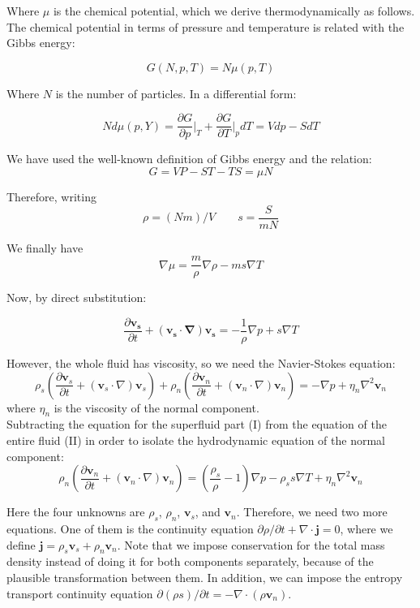 \documentclass{article}
\begin{document}
Where $\mu$ is the chemical potential, which we derive thermodynamically as follows. The chemical potential in terms of pressure and temperature is related with the Gibbs energy:

\[G(N, p, T)= N \mu(p, T)\]

Where $N$ is the number of particles. In a differential form:

\[N d\mu(p, Y) = \frac{\partial G}{\partial p} \bigg|_T + \frac{\partial G}{\partial T}\bigg|_p dT = Vdp - S dT\]

We have used the well-known definition of Gibbs energy and the relation:
\[G = VP - ST - TS = \mu N\]

Therefore, writing 
\[\rho = (Nm)/V \qquad s = \frac{S}{mN}\]

We finally have
\[\nabla \mu = \frac{m}{\rho} \nabla \rho - m s \nabla T\]

Now, by direct substitution:

\[\frac{\partial \mathbf{v_s}}{\partial t} + (\mathbf{v_s}\cdot \mathbf{\nabla})\mathbf{v_s} = -\frac{1}{\rho}\nabla p + s \nabla T \tag{I}\]

However, the whole fluid has viscosity, so we need the Navier-Stokes equation:
\[
\rho_s \left( \frac{\partial \mathbf{v}_s}{\partial t} + (\mathbf{v}_s \cdot \nabla) \mathbf{v}_s \right) + \rho_n \left( \frac{\partial \mathbf{v}_n}{\partial t} + (\mathbf{v}_n \cdot \nabla) \mathbf{v}_n \right) = -\nabla p + \eta_n \nabla^2 \mathbf{v}_n \tag{II}
\]
where $\eta_n$ is the viscosity of the normal component.
\\

Subtracting the equation for the superfluid part (I) from the equation of the entire fluid (II) in order to isolate the hydrodynamic equation of the normal component:
\[
\rho_n \left( \frac{\partial \mathbf{v}_n}{\partial t} + (\mathbf{v}_n \cdot \nabla) \mathbf{v}_n \right) = \left( \frac{\rho_s}{\rho} - 1 \right) \nabla p - \rho_s s \nabla T + \eta_n \nabla^2 \mathbf{v}_n \]

Here the four unknowns are $\rho_s$, $\rho_n$, $\mathbf{v}_s$, and $\mathbf{v}_n$. Therefore, we need two more equations. One of them is the continuity equation $\partial \rho / \partial t + \nabla \cdot \mathbf{j} = 0$, where we define $\mathbf{j} = \rho_s \mathbf{v}_s + \rho_n \mathbf{v}_n $. Note that we impose conservation for the total mass density instead of doing it for both components separately, because of the plausible transformation between them. In addition, we can impose the entropy transport continuity equation $\partial (\rho s) / \partial t = - \nabla \cdot (\rho \mathbf{v}_n)$.
\end{document}
